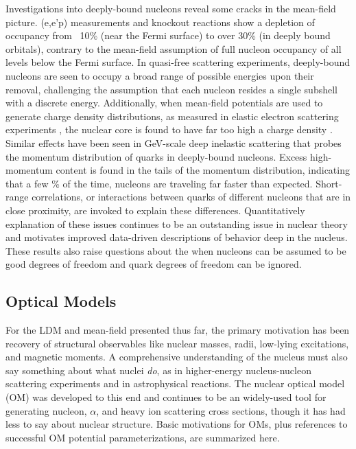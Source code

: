 Investigations into deeply-bound nucleons reveal some cracks in the mean-field
picture.  (e,e'p) measurements \cite{eep1, eep2} and knockout reactions \cite{knockout1,
knockout2} show a depletion of occupancy from ~10\% (near the Fermi surface) to
over 30\% (in deeply bound orbitals), contrary to the mean-field assumption of
full nucleon occupancy of all levels below the Fermi surface. In quasi-free
scattering experiments, deeply-bound nucleons are seen to occupy a broad range
of possible energies upon their removal, challenging the assumption that each
nucleon resides a single subshell with a discrete energy. Additionally, when mean-field
potentials are used to generate charge density distributions, as measured in
elastic electron scattering experiments \cite{DeVries}, the nuclear core is found to
have far too high a charge density \cite{ChargeDensityCoreExample}. Similar
effects have been seen in GeV-scale deep inelastic scattering that probes the momentum
distribution of quarks in deeply-bound nucleons. Excess high-momentum content is
found in the tails of the momentum distribution, indicating that a few \% of the time, 
nucleons are traveling far faster than expected. Short-range correlations, or
interactions between quarks of different nucleons that are in close proximity,
are invoked to explain these differences.
Quantitatively explanation of these issues continues to be an outstanding issue in nuclear 
theory and motivates improved data-driven descriptions of behavior deep in the nucleus.
These results also raise questions about
the when nucleons can be assumed to be good degrees of freedom and quark degrees of freedom 
can be ignored.

\subsection{Optical Models}
For the LDM and mean-field presented thus far, the primary motivation has been recovery
of structural observables like nuclear masses, radii, low-lying excitations, and magnetic moments. 
A comprehensive understanding of the nucleus must also say something about what
nuclei \textit{do}, as in higher-energy nucleus-nucleon scattering experiments
and in astrophysical reactions.
The nuclear optical model (OM) was developed to this end and continues to be an
widely-used tool for generating nucleon, $\alpha$, and heavy ion scattering
cross sections, though it has had less to say about nuclear structure. Basic
motivations for OMs, plus references to successful OM potential parameterizations,
are summarized here.

